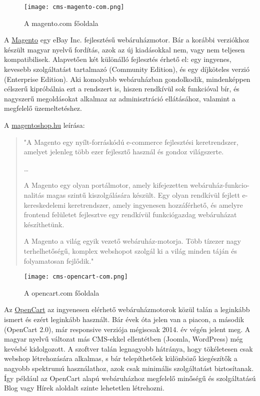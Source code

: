 \newpage


\begin{figure}
	\texttt{[image: cms-magento-com.png]}
	\caption{A magento.com főoldala}
\end{figure}

A \href{http://magento.com/}{Magento} egy eBay Inc. fejlesztésű webáruházmotor. Bár a korábbi verziókhoz készült magyar nyelvű fordítás, azok az új kiadásokkal nem, vagy nem teljesen kompatibilisek. Alapvetően két különálló fejlesztés érhető el: egy ingyenes, kevesebb szolgáltatást tartalmazó (Community Edition), és egy díjköteles verzió (Enterprise Edition). Aki komolyabb webáruházban gondolkodik, mindenképpen célszerű kipróbálnia ezt a rendszert is, hiszen rendkívül sok funkcióval bír, és nagyszerű megoldásokat alkalmaz az adminisztráció ellátásához, valamint a megfelelő üzemeltetéshez.

A \href{http://magentoshop.hu/a-magento-keretrendszerrol/}{magentoshop.hu} leírása:

\begin{quote}
"A Magento egy nyílt-forráskódú e-commerce fejlesztési keretrendszer, amelyet jelenleg több ezer fejlesztő használ és gondoz világszerte.

\dots

A Magento egy olyan portálmotor, amely kifejezetten webáruház-funkcio- nalitás magas szintű kiszolgálására készült. Egy olyan rendkívül fejlett e-kereskedelemi keretrendszer, amely ingyenesen hozzáférhető, és amelyre\\ frontend felületet fejlesztve egy rendkívül funkciógazdag webáruházat készíthetünk.

A Magento a világ egyik vezető webáruház-motorja. Több tízezer nagy terhelhetőségű, komplex webshopot szolgál ki a világ minden táján és folyamatosan fejlődik."
\end{quote}

\newpage


\begin{figure}
	\texttt{[image: cms-opencart-com.png]}
	\caption{A opencart.com főoldala}
\end{figure}

Az \href{http://www.opencart.com/}{OpenCart} az ingyenesen elérhető webáruházmotorok közül talán a leginkább ismert és ezért leginkább használt. Bár évek óta jelen van a piacon, a második (OpenCart 2.0), már responsive verziója mégiscsak 2014. év végén jelent meg. A magyar nyelvű változat más CMS-ekkel ellentétben (Joomla, WordPress) még kevésbé kidolgozott. A szoftver talán legnagyobb hátránya, hogy tökéletesen csak webshop létrehozására alkalmas, s bár telepíthetőek különböző kiegészítők a nagyobb spektrumú használathoz, azok csak minimális szolgáltatást biztosítanak. Így például az OpenCart alapú webáruházhoz megfelelő minőségű és szolgáltatású Blog vagy Hírek aloldalt szinte lehetetlen létrehozni.

